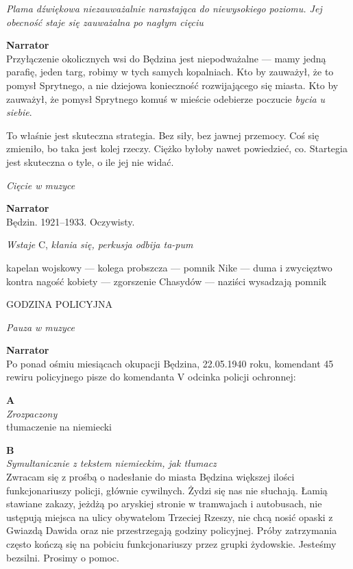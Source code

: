 \documentclass[11pt,a4paper,oneside]{article}
\begin{document}
{\color{light-gray} \emph{Plama dźwiękowa niezauważalnie narastająca
do niewysokiego poziomu. Jej obecność staje się zauważalna po nagłym
cięciu}}

\textbf{Narrator}\\
Przyłączenie okolicznych wsi do Będzina jest niepodważalne --- mamy
jedną parafię, jeden targ, robimy w  tych samych kopalniach. Kto by
zauważył, że to pomysł Sprytnego, a nie dziejowa konieczność
rozwijającego się miasta.  Kto by zauważył, że pomysł Sprytnego komuś
w mieście odebierze poczucie \emph{bycia u siebie}.  

To właśnie jest skuteczna strategia. Bez siły, bez jawnej przemocy.
Coś się zmieniło, bo taka jest kolej rzeczy.  Ciężko byłoby nawet
powiedzieć, co. Startegia jest skuteczna o tyle, o ile jej nie widać. 

{\color{light-gray} \emph{Cięcie w muzyce}}


\textbf{Narrator}\\
Będzin. 1921--1933. Oczywisty. 

{\color{light-gray} \emph{Wstaje} C, \emph{kłania się, perkusja odbija
ta-pum}}

{\color{red} kapelan wojskowy --- kolega probszcza --- pomnik Nike --- duma
i zwycięztwo kontra nagość kobiety --- zgorszenie Chasydów --- naziści
wysadzają pomnik}


{\color{red}
GODZINA POLICYJNA
}

{\color{light-gray} \emph{Pauza w muzyce}}

\textbf{Narrator}\\
Po ponad ośmiu miesiącach okupacji Będzina, 22.05.1940 roku, komendant 45
rewiru policyjnego pisze do komendanta V odcinka policji ochronnej:

\textbf{A}\\
{\color{light-gray} \emph{Zrozpaczony}}\\
{\color{red} tłumaczenie na niemiecki}


\textbf{B}\\
{\color{light-gray} \emph{Symultanicznie z tekstem niemieckim, jak tłumacz}}\\
Zwracam się z prośbą o nadesłanie do miasta Będzina większej ilości
funkcjonariuszy policji, głównie cywilnych. Żydzi się nas nie słuchają. Łamią
stawiane zakazy, jeżdżą po aryskiej stronie w tramwajach i autobusach, nie
ustępują miejsca na ulicy obywatelom Trzeciej Rzeszy, nie chcą nosić opaski
z Gwiazdą Dawida oraz nie przestrzegają godziny policyjnej. Próby zatrzymania
często kończą się na pobiciu funkcjonariuszy przez grupki żydowskie. Jesteśmy 
bezsilni. Prosimy o pomoc.
\end{document}
